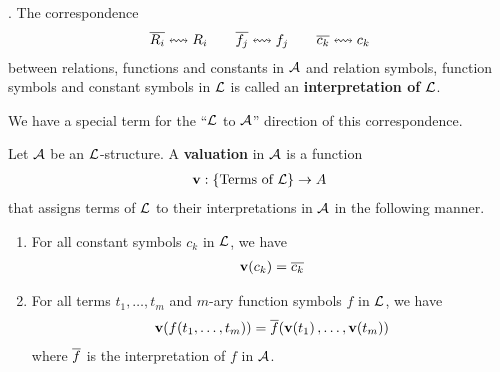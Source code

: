 \begin{boxdefinition}[Interpretation]
    . The correspondence
    \begin{align*}
        \overline{R_i} \leftrightsquigarrow R_i
        \qquad
        \overline{f_j} \leftrightsquigarrow f_j
        \qquad
        \overline{c_k} \leftrightsquigarrow c_k
    \end{align*}
    between relations, functions and constants in $\mathcal{A}$ and relation symbols, function symbols and constant symbols in $\mathcal{L}$ is called an \textbf{interpretation of $\mathcal{L}$}.
\end{boxdefinition}

We have a special term for the ``$\mathcal{L}$ to $\mathcal{A}$'' direction of this correspondence.

\begin{boxdefinition}[Valuation]
    Let $\mathcal{A}$ be an $\mathcal{L}$-structure. A \textbf{valuation} in $\mathcal{A}$ is a function
    \begin{align*}
        \mathbf{v} : \left\{ \text{Terms of } \mathcal{L} \right\} \to A
    \end{align*}
    that assigns terms of $\mathcal{L}$ to their interpretations in $\mathcal{A}$ in the following manner.
    \begin{enumerate}
        \item For all constant symbols $c_k$ in $\mathcal{L}$, we have
        \begin{align*}
            \mathbf{v}\!\left( c_k \right) = \overline{c_k}
        \end{align*}
        
        \item For all terms $t_1, \ldots, t_m$ and $m$-ary function symbols $f$ in $\mathcal{L}$, we have
        \begin{align*}
            \mathbf{v}\!\left( f\!\left( t_1, \ldots, t_m \right) \right) = \overline{f}\!\left( \mathbf{v}\!\left( t_1 \right), \ldots, \mathbf{v}\!\left( t_m \right) \right)
        \end{align*}
        where $\overline{f}$ is the interpretation of $f$ in $\mathcal{A}$.
    \end{enumerate}
\end{boxdefinition}
